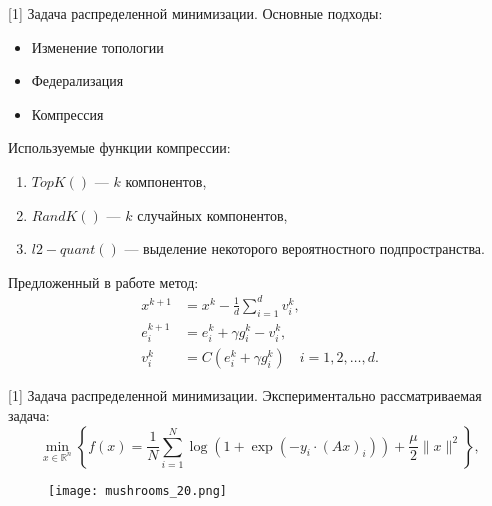 \begin{frame}{[1] Задача распределенной минимизации.}
    Основные подходы:
    \begin{itemize}
        \item Изменение топологии
        \item Федерализация
        \item Компрессия
    \end{itemize}

    Используемые функции компрессии:
    \begin{enumerate}
        \item $TopK()$ --- $k$ компонентов,
        \item $RandK()$ --- $k$ случайных компонентов,
        \item $l2-quant()$ --- выделение некоторого вероятностного подпространства. 
    \end{enumerate}

    Предложенный в работе метод:
    $$
    \begin{aligned} 
        x^{k+1} &=x^k-\frac{1}{d} \sum_{i=1}^d v_i^k, \\ 
        e_i^{k+1} &=e_i^k + \gamma g_i^k - v_i^k, \\
        v_i^k &= C(e_i^k + \gamma g_i^k) \quad i=1,2, \ldots, d.
    \end{aligned}
    $$
\end{frame}


\begin{frame}{[1] Задача распределенной минимизации.}
    Экспериментально рассматриваемая задача:
    $$
    \min_{x \in \mathbb{R}^n}\left\{ f(x) = \frac{1}{N} \sum_{i=1}^N \log \left(1+\exp \left(- y_i \cdot(A x)_i\right)\right) + \frac{\mu}{2}\|x\|^2 \right\},
    $$
    \begin{figure}
        \begin{center}
          \texttt{[image: mushrooms\_20.png]}
        \end{center}
    \end{figure}
    
\end{frame}

